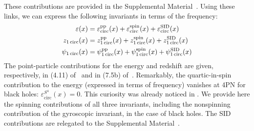 \documentclass[prd,superscriptaddress,preprintnumbers,tightenlines,nofootinbib, eqsecnum]{revtex4-2}
\begin{document}
These contributions are provided in the Supplemental Material~\cite{Supplemental}.
%
Using these links, we can express the following invariants in terms of the frequency:
\begin{subequations}
    \begin{align}
    \varepsilon(x)&=  \varepsilon_\text{circ}^\text{pp}(x)+\varepsilon_\text{circ}^\text{spin}(x)+\varepsilon_\text{circ}^\text{SID}(x) \\
    z_\text{1\,circ}(x) &= z_\text{1\,circ}^\text{pp}(x)+z_\text{1\,circ}^\text{spin}(x)+z_\text{1\,circ}^\text{SID}(x) \\
    \psi_\text{1\,circ}(x) &= \psi_\text{1\,circ}^\text{pp}(x)+\psi_\text{1\,circ}^\text{spin}(x)+\psi_\text{1\,circ}^\text{SID}(x)
\end{align}
\end{subequations}
The point-particle contributions for the energy and redshift are given, respectively, in (4.11) of~\cite{Bernard:2016wrg} and in (7.5b) of~\cite{Trestini:2025yyc}. Remarkably, the quartic-in-spin contribution to the energy (expressed in terms of frequency) vanishes at 4PN for black holes: $\varepsilon_{\text{circ}}^{S^4}(x) =0$. This curiosity was already noticed in \cite{Siemonsen:2017yux}. We provide here the spinning contributions of all three invariants, including the nonspinning contribution of the gyroscopic invariant, in the case of black holes. The SID contributions are relegated to the Supplemental Material~\cite{Supplemental}. 
\end{document}
